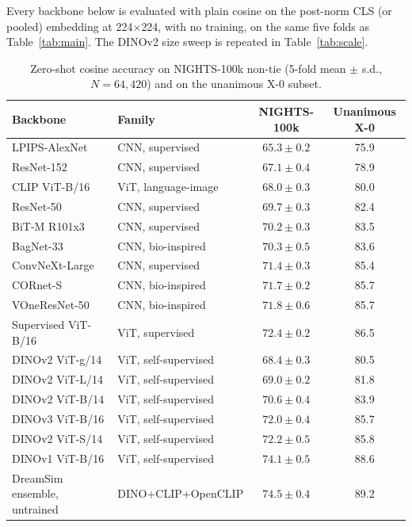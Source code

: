 \clearpage
{}
\vspace{1em}

Every backbone below is evaluated with plain cosine on the post-norm CLS (or pooled) embedding at 224$\times$224, with no training, on the same five folds as Table~\ref{tab:main}. The DINOv2 size sweep is repeated in Table~\ref{tab:scale}.

\begin{table}[ht]
\caption{Zero-shot cosine accuracy on NIGHTS-100k non-tie (5-fold mean $\pm$ s.d., $N=64{,}420$) and on the unanimous X-0 subset.}
\label{tab:backbones}
\centering
\small
\begin{tabular}{llcc}
\toprule
Backbone & Family & NIGHTS-100k & Unanimous X-0 \\
\midrule
LPIPS-AlexNet          & CNN, supervised       & $65.3 \pm 0.2$ & 75.9 \\
ResNet-152             & CNN, supervised       & $67.1 \pm 0.4$ & 78.9 \\
CLIP ViT-B/16          & ViT, language-image   & $68.0 \pm 0.3$ & 80.0 \\
ResNet-50              & CNN, supervised       & $69.7 \pm 0.3$ & 82.4 \\
BiT-M R101x3           & CNN, supervised       & $70.2 \pm 0.3$ & 83.5 \\
BagNet-33              & CNN, bio-inspired     & $70.3 \pm 0.5$ & 83.6 \\
ConvNeXt-Large         & CNN, supervised       & $71.4 \pm 0.3$ & 85.4 \\
CORnet-S               & CNN, bio-inspired     & $71.7 \pm 0.2$ & 85.7 \\
VOneResNet-50          & CNN, bio-inspired     & $71.8 \pm 0.6$ & 85.7 \\
Supervised ViT-B/16    & ViT, supervised       & $72.4 \pm 0.2$ & 86.5 \\
\midrule
DINOv2 ViT-g/14        & ViT, self-supervised  & $68.4 \pm 0.3$ & 80.5 \\
DINOv2 ViT-L/14        & ViT, self-supervised  & $69.0 \pm 0.2$ & 81.8 \\
DINOv2 ViT-B/14        & ViT, self-supervised  & $70.6 \pm 0.4$ & 83.9 \\
DINOv3 ViT-B/16        & ViT, self-supervised  & $72.0 \pm 0.4$ & 85.7 \\
DINOv2 ViT-S/14        & ViT, self-supervised  & $72.2 \pm 0.5$ & 85.8 \\
DINOv1 ViT-B/16        & ViT, self-supervised  & $74.1 \pm 0.5$ & 88.6 \\
\midrule
DreamSim ensemble, untrained & DINO+CLIP+OpenCLIP & $74.5 \pm 0.4$ & 89.2 \\
\bottomrule
\end{tabular}
\end{table}

